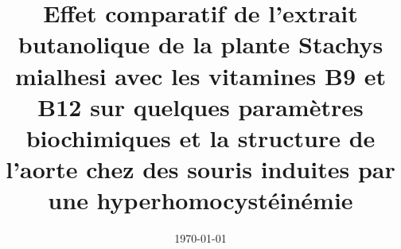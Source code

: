 \documentclass[12pt, a4paper]{article}
\title{Effet comparatif de l’extrait butanolique de la plante Stachys mialhesi avec les vitamines B9 et B12 sur quelques paramètres biochimiques et la structure de l’aorte chez des souris induites par une hyperhomocystéinémie}
\author{} %
\date{\today}
\begin{document}
\maketitle
\begin{abstract}
\end{abstract}







\end{document}

